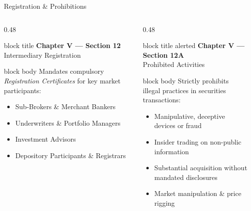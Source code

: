 \documentclass[aspectratio=169,10pt]{beamer}
\begin{document}
	\begin{frame}{Registration \& Prohibitions}
		\begin{columns}[T, onlytextwidth]
			\begin{column}{0.48\textwidth}
				\begin{beamercolorbox}[rounded=true, sep=4pt]{block title}
					\centering\textbf{Chapter V --- Section 12}\\[2pt]
					\textcolor{rpBase}{\small Intermediary Registration}
				\end{beamercolorbox}
				\vspace{-4pt}
				\begin{beamercolorbox}[rounded=true, sep=5pt]{block body}
					\small Mandates compulsory \textit{Registration Certificates} for key market participants:
					\begin{itemize}\small
						\item Sub-Brokers \& Merchant Bankers
						\item Underwriters \& Portfolio Managers
						\item Investment Advisors
						\item Depository Participants \& Registrars
					\end{itemize}
				\end{beamercolorbox}
			\end{column}
			\begin{column}{0.48\textwidth}
				\begin{beamercolorbox}[rounded=true, sep=4pt]{block title alerted}
					\centering\textbf{Chapter V --- Section 12A}\\[2pt]
					\textcolor{rpBase}{\small Prohibited Activities}
				\end{beamercolorbox}
				\vspace{-4pt}
				\begin{beamercolorbox}[rounded=true, sep=5pt]{block body}
					\small Strictly prohibits illegal practices in securities transactions:
					\begin{itemize}\small
						\item Manipulative, deceptive devices or fraud
						\item Insider trading on non-public information
						\item Substantial acquisition without mandated disclosures
						\item Market manipulation \& price rigging
					\end{itemize}
				\end{beamercolorbox}
			\end{column}
		\end{columns}
	\end{frame}
	
\end{document}
